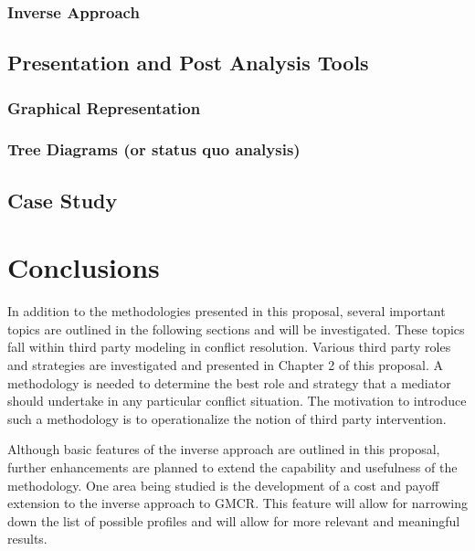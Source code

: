 \documentclass[letterpaper,12pt,titlepage,oneside,final]{book}
\begin{document}
\subsection{Inverse Approach}

\section{Presentation and Post Analysis Tools}

\subsection{Graphical Representation}
\subsection{Tree Diagrams (or status quo analysis)}

\section{Case Study}




\chapter{Conclusions}
In addition to the methodologies presented in this proposal, several important topics are outlined in the following sections and will be investigated. These topics fall within third party modeling in conflict resolution.
Various third party roles and strategies are investigated and presented in Chapter 2 of this proposal. A methodology is needed to determine the best role and strategy that a mediator should undertake in any particular conflict situation. The motivation to introduce such a methodology is to operationalize the notion of third party intervention.

Although basic features of the inverse approach are outlined in this proposal, further enhancements are planned to extend the capability and usefulness of the methodology. One area being studied is the development of a cost and payoff extension to the inverse approach to GMCR. This feature will allow for narrowing down the list of possible profiles and will allow for more relevant and meaningful results.
\end{document}
